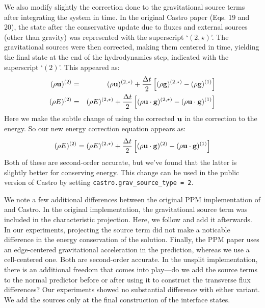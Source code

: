 \documentclass[12pt,preprint]{aastex}
\begin{document}
We also modify slightly the correction done to the gravitational
source terms after integrating the system in time.  In the original
Castro paper (Eqs. 19 and 20), the state after the conservative update
due to fluxes and external sources (other than gravity) was
represented with the superscript `$(2,\star)$'.  The gravitational
sources were then corrected, making them centered in time, yielding
the final state at the end of the hydrodynamics step, indicated with
the superscript `$(2)$'.  This appeared as:
\begin{eqnarray}
(\rho {\bf u})^{(2)} &=& (\rho {\bf u})^{(2,\star)} +
   \frac{\Delta t}{2} \left [ (\rho {\bf g})^{(2,\star)} - 
                              (\rho {\bf g})^{(1)} \right ]\\
(\rho E)^{(2)} &=& (\rho E)^{(2,\star)} +
   \frac{\Delta t}{2} \left [ (\rho {\bf u\cdot g})^{(2,\star)} - 
                              (\rho {\bf u\cdot g})^{(1)} \right ]
\end{eqnarray}
Here we make the subtle change of using the corrected ${\bf u}$ in the
correction to the energy.  So our new energy correction equation appears as:
\begin{equation}
(\rho E)^{(2)} = (\rho E)^{(2,\star)} +
   \frac{\Delta t}{2} \left [ (\rho {\bf u\cdot g})^{(2)} - 
                              (\rho {\bf u\cdot g})^{(1)} \right ]
\end{equation}
Both of these are second-order accurate, but we've found that the latter
is slightly better for conserving energy.  This change can be used in the
public version of Castro by setting {\tt castro.grav\_source\_type = 2}.

We note a few additional differences between the original PPM
implementation of \citet{ppm} and Castro.  In the original
implementation, the gravitational source term was included in the
characteristic projection.  Here, we follow \citet{ppmunsplit} and add
it afterwards.  In our experiments, projecting the source term did not
make a noticable difference in the energy conservation of the
solution.  Finally, the PPM paper uses an edge-centered gravitational
acceleration in the prediction, whereas we use a cell-centered one.
Both are second-order accurate.  In the unsplit implementation, there
is an additional freedom that comes into play---do we add the source
terms to the normal predictor before or after using it to construct
the transverse flux differences?  Our experiments showed no
substantial difference with either variant.  We add the sources only
at the final construction of the interface states.
\end{document}
